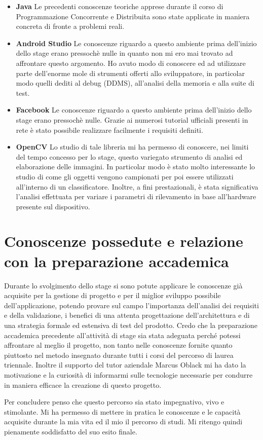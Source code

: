 \begin{itemize}
\item \textbf{Java} Le precedenti conoscenze teoriche apprese durante il corso di Programmazione Concorrente e Distribuita sono state applicate in maniera concreta di fronte a problemi reali. 
\item \textbf{Android Studio} Le conoscenze riguardo a questo ambiente prima dell'inizio dello stage erano pressochè nulle in quanto non mi ero mai trovato ad affrontare
questo argomento. Ho avuto modo di conoscere ed ad utilizzare parte dell'enorme mole di strumenti offerti allo sviluppatore, in particolar modo quelli dediti al debug (DDMS), all'analisi della memoria e alla suite di test.
\item \textbf{Facebook} Le conoscenze riguardo a questo ambiente prima dell'inizio dello stage erano pressochè nulle. Grazie ai numerosi tutorial ufficiali presenti in rete è stato possibile realizzare facilmente i requisiti definiti.
\item \textbf{OpenCV} Lo studio di tale libreria mi ha permesso di conoscere, nei limiti del tempo concesso per lo stage, questo variegato strumento di analisi ed elaborazione delle immagini. In particolar modo è stato molto interessante lo studio di come gli oggetti vengono campionati per poi essere utilizzati all'interno di un classificatore. Inoltre, a fini prestazionali, è stata significativa l'analisi effettuata per variare i parametri di rilevamento in base all'hardware presente sul dispositivo. 
\end{itemize}





\section{Conoscenze possedute e relazione con la preparazione accademica}

Durante lo svolgimento dello stage si sono potute applicare le conoscenze già
acquisite per la gestione di progetto e per il miglior sviluppo possibile dell'applicazione,
potendo provare sul campo l'importanza dell'analisi dei requisiti e della
validazione, i benefici di una attenta progettazione dell'architettura e
di una strategia formale ed estensiva di test del prodotto.
Credo che la preparazione accademica precedente all'attività di stage
sia stata adeguata perché potessi affrontare al meglio il progetto, non tanto
nelle conoscenze fornite quanto piuttosto nel metodo insegnato durante tutti i
corsi del percorso di laurea triennale. Inoltre il supporto del tutor aziendale Marcus Oblack mi ha dato la motivazione e la curiosità di informarmi sulle tecnologie necessarie per condurre in maniera efficace la creazione di questo progetto.

Per concludere penso che questo percorso sia stato impegnativo, vivo e stimolante. Mi ha
permesso di mettere in pratica le conoscenze e le capacità acquisite durante la mia vita ed il mio il percorso di studi. Mi ritengo quindi pienamente soddisfatto del suo esito finale.

